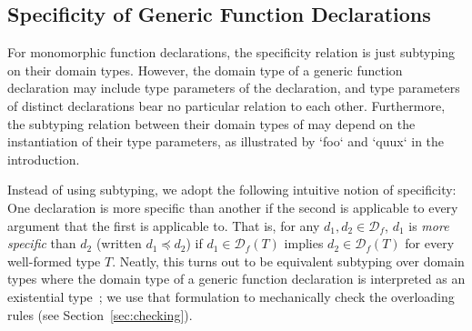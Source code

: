 \documentclass[10pt]{sigplanconf}
\newcommand{\TODO}[1]{\textbf{\emph{\textcolor{red}{TODO}}}: \textsf{\footnotesize #1}}
\newcommand{\ms}{\preceq}
\newcommand{\D}{\ensuremath{\mathcal{D}}}
\newcommand{\Df}[1][f]{\D_{\!#1}}
\begin{document}



\subsection{Specificity of Generic Function Declarations}

For monomorphic function declarations, 
the specificity relation is just subtyping on their domain types.
However,
the domain type of a generic function declaration 
may include type parameters of the declaration, 
and type parameters of distinct declarations 
bear no particular relation to each other.
Furthermore, the subtyping relation between their domain types of 
may depend on the instantiation of their type parameters, 
as illustrated by `foo` and `quux` in the introduction.

Instead of using subtyping,
we adopt the following intuitive notion of specificity:
One declaration is more specific than another 
if the second is applicable to every argument 
that the first is applicable to.
That is, 
for any $d_1, d_2 \in \Df$, 
$d_1$ is \emph{more specific} than $d_2$ 
(written $d_1 \ms d_2$) if 
$d_1 \in \Df(T)$ implies $d_2 \in \Df(T)$
for every well-formed type $T$.
Neatly, 
this turns out to be equivalent 
subtyping over domain types 
where the domain type of a generic function declaration 
is interpreted as an existential type~\cite{bourdoncle97};
we use that formulation 
to mechanically check the overloading rules 
(see Section~\ref{sec:checking}).
\end{document}
